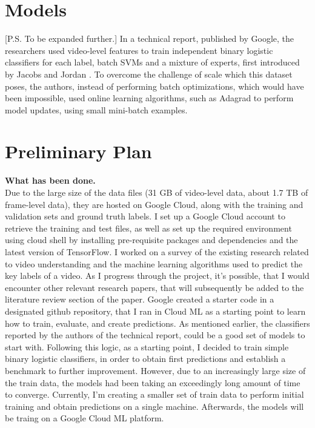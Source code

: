 \documentclass{sig-alternate-05-2015}
\begin{document}
\section{Models}
[P.S. To be expanded further.] 
In a technical report, published by Google, the researchers used video-level features to train independent binary logistic classifiers for each label, batch SVMs and a mixture of experts, first introduced by Jacobs and Jordan \cite{13}. To overcome the challenge of scale which this dataset poses, the authors, instead of performing batch optimizations, which would have been impossible, used online learning algorithms, such as Adagrad to perform model updates, using small mini-batch examples. 

\section{Preliminary Plan}
\textbf{What has been done.} \\
Due to the large size of the data files (31 GB of video-level data, about 1.7 TB of frame-level data), they are hosted on Google Cloud, along with the training and validation sets and ground truth labels. I set up a Google Cloud account to retrieve the training and test files, as well as set up the required environment using cloud shell by installing pre-requisite packages and dependencies and the latest version of TensorFlow. I worked on a survey of the existing research related to video understanding and the machine learning algorithms used to predict the key labels of a video. As I progress through the project, it's possible, that I would encounter other relevant research papers, that will subsequently be added to the literature review section of the paper. 
Google created a starter code in a designated github repository, that I ran in Cloud ML as a starting point to learn how to train, evaluate, and create predictions. As mentioned earlier, the classifiers reported by the authors of the technical report, could be a good set of models to start with. Following this logic, as a starting point, I decided to train simple binary logistic classifiers, in order to obtain first predictions and establish a benchmark to further improvement. However, due to an increasingly large size of the train data, the models had been taking an exceedingly long amount of time to converge. Currently, I'm creating a smaller set of train data to perform initial training and obtain predictions on a single machine. Afterwards, the models will be traing on a Google Cloud ML platform. 
\end{document}
